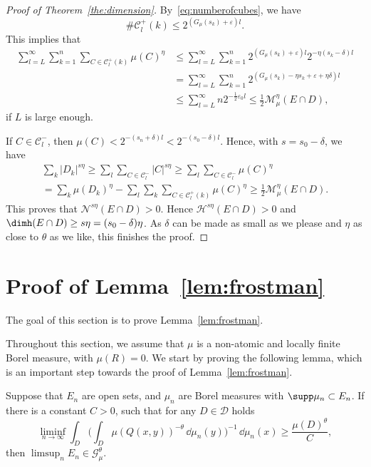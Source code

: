 \begin{proof}[Proof of Theorem~\ref{the:dimension}]
By~\eqref{eq:numberofcubes}, we have
\[
\# \mathscr{C}_l^+ (k) \leq 2^{(G_{\mu} (s_k) + \varepsilon)l}.
\]
This implies that
\begin{align*}
\sum_{l=L}^\infty \sum_{k=1}^n \sum_{C \in \mathscr{C}_l^+ (k)}
\mu (C)^\eta &\leq \sum_{l=L}^\infty \sum_{k=1}^n 2^{(G_{\mu} (s_k) + \varepsilon)l} 2^{-\eta (s_k-\delta) l} \\ & =
\sum_{l=L}^\infty \sum_{k=1}^n 2^{(G_\mu (s_k) - \eta s_k +
\varepsilon + \eta \delta) l} \\ &\leq \sum_{l=L}^\infty n 2^{-\frac{1}{2} \varepsilon_0 l} \leq \frac{1}{2}
\mathscr{M}_\mu^\eta (E \cap D),
\end{align*}
if $L$ is large enough.

If $C \in \mathscr{C}_l^-$, then $\mu (C) < 2^{-(s_n+\delta)l} < 2^{-(s_0-\delta)l}$. Hence, with $s = s_0 - \delta$, we have
\begin{multline*}
\sum_k |D_k|^{s \eta} \geq \sum_l \sum_{C \in \mathscr{C}_l^-} |C|^{s \eta} \geq \sum_l \sum_{C \in \mathscr{C}_l^-} \mu (C)^\eta \\ = \sum_k \mu(D_k)^\eta - \sum_l \sum_k \sum_{C \in
\mathscr{C}_l^+ (k)} \mu (C)^\eta \geq \frac{1}{2}
\mathscr{M}_\mu^\eta (E \cap D).
\end{multline*}
This proves that $\mathscr{N}^{s \eta} (E \cap D) > 0$. Hence $\mathscr{H}^{s \eta} (E \cap D) > 0$ and $\dimh (E \cap D) \geq s
\eta = (s_0 - \delta) \eta$. As $\delta$ can be made as small as we please and $\eta$ as close to $\theta$ as we like, this finishes the proof.
\end{proof}


\section{Proof of Lemma~\ref{lem:frostman}} \label{sec:inhomogeneousproofs}

The goal of this section is to prove Lemma~\ref{lem:frostman}.

Throughout this section, we assume that $\mu$ is a non-atomic and locally finite Borel measure, with $\mu (R) = 0$. We start by proving the following lemma, which is an important step towards the proof of Lemma~\ref{lem:frostman}.

\begin{lemm}\label{lem:frostman2}
Suppose that $E_n$ are open sets, and $\mu_n$ are Borel measures with $\supp \mu_n \subset E_n$. If there is a constant $C > 0$, such that for any $D \in \mathscr{D}$ holds
\begin{equation}\label{eq:energycondition}
\liminf_{n \to \infty} \int_D \biggl(\int_D \mu (Q (x,y))^{-\theta} \, \dd \mu_n (y) \biggr)^{-1} \,
\dd \mu_n (x) \geq \frac{\mu (D)^\theta}{C},
\end{equation}
then $\limsup_n E_n \in \mathscr{G}_\mu^\theta$.
\end{lemm}

